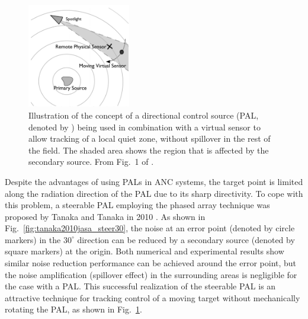 \begin{figure}[!htb]
    \centering
    \includegraphics[width = 0.4\textwidth]{fig/kidner2006fig1_resize.png}
    \caption{Illustration of the concept of a directional control source (PAL, denoted by ) being used in combination with a virtual sensor to allow tracking of a local quiet zone, without spillover in the rest of the field. The shaded area shows the region that is affected by the secondary source. From Fig.~1 of \cite{Kidner2006FeasibilityStudyLocalised}.}
    \label{fig:kidner2006_sketch}
\end{figure}

Despite the advantages of using PALs in ANC systems, the target point is limited along the radiation direction of the PAL due to its sharp directivity. 
To cope with this problem, a steerable PAL employing the phased array technique was proposed by Tanaka and Tanaka in 2010 \cite{Tanaka2010ActiveNoiseControl}.
As shown in Fig.~\ref{fig:tanaka2010jasa_steer30}, the noise at an error point (denoted by circle markers) in the $30^\circ$ direction can be reduced by a secondary source (denoted by square markers) at the origin.
Both numerical and experimental results show similar noise reduction performance can be achieved around the error point, but the noise amplification (spillover effect) in the {surrounding} areas is negligible for the case with a PAL.
This successful realization of the steerable PAL is an attractive technique for tracking control of a moving target without mechanically rotating the PAL, as shown in Fig.~\ref{fig:kidner2006_sketch}.

